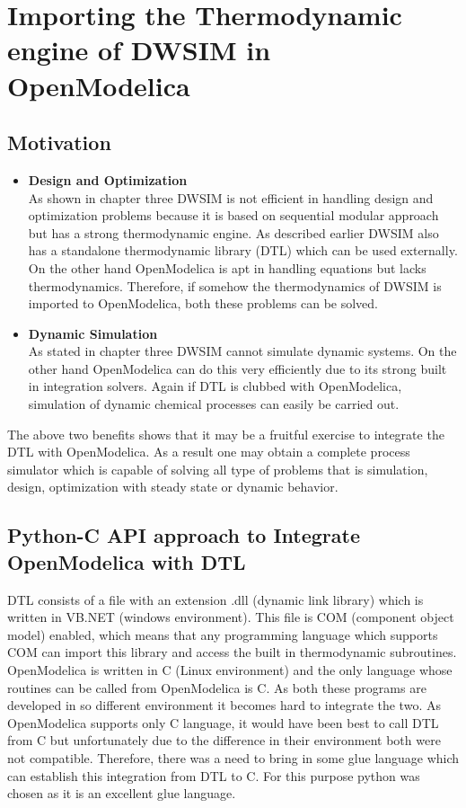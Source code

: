 \documentclass[12pt]{report}
\begin{document}
\chapter{Importing the Thermodynamic engine of DWSIM in OpenModelica}

\section{Motivation}
\begin{itemize}
\item{\textbf{Design and Optimization}} \\
As shown in chapter three DWSIM is not efficient in handling design and optimization problems because it is based on sequential modular approach but has a strong thermodynamic engine. As described earlier DWSIM also has a standalone thermodynamic library (DTL) which can be used externally. On the other hand OpenModelica is apt in handling equations but lacks thermodynamics. Therefore, if somehow the thermodynamics of DWSIM is imported to OpenModelica, both these problems can be solved.

\item{\textbf{Dynamic Simulation}} \\
As stated in chapter three DWSIM cannot simulate dynamic systems. On the other hand OpenModelica can do this very efficiently due to its strong built in integration solvers. Again if DTL is clubbed with OpenModelica, simulation of dynamic chemical processes can easily be carried out.

\end{itemize}
The above two benefits shows that it may be a fruitful exercise to integrate the DTL with OpenModelica. As a result one may obtain a complete process simulator which is capable of solving all type of problems that is simulation, design, optimization with steady state or dynamic behavior.

\section{Python-C API approach to Integrate OpenModelica with DTL} \cite{api}
DTL consists of a file with an extension .dll (dynamic link library) which is written in VB.NET (windows environment). This file is COM (component object model) enabled, which means that any programming language which supports COM can import this library and access the built in thermodynamic subroutines. OpenModelica is written in C (Linux environment) and the only language whose routines can be called from OpenModelica is C. As both these programs are developed in so different environment it becomes hard to integrate the two.
As OpenModelica supports only C language, it would have been best to call DTL from C but unfortunately due to the difference in their environment both were not compatible. Therefore, there was a need to bring in some glue language which can establish this integration from DTL to C. For this purpose python was chosen as it is an excellent glue language.
\end{document}
